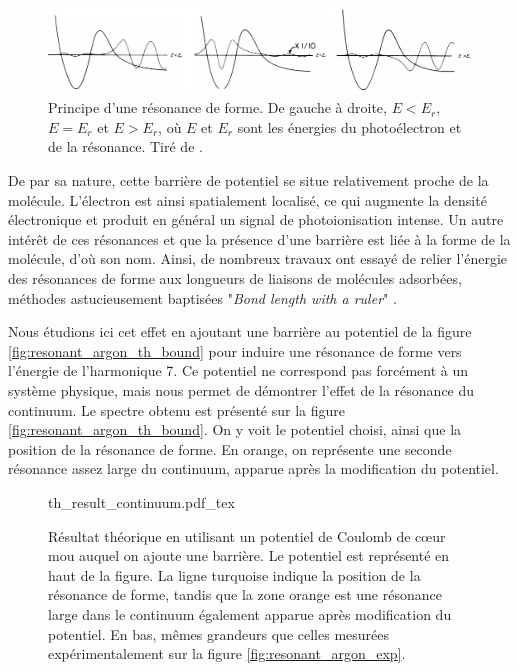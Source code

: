\begin{figure}[!ht]
\centering
\includegraphics[width=1\columnwidth]{Figures/ResonantArgon/shape_resonance.pdf}%
\caption{Principe d'une résonance de forme. De gauche à droite, $E<E_r$, $E=E_r$ et $E>E_r$, où $E$ et $E_r$ sont les énergies du photoélectron et de la résonance. Tiré de .}
\label{fig:shaperesonance}
\end{figure}

De par sa nature, cette barrière de potentiel se situe relativement proche de la molécule. L'électron est ainsi spatialement localisé, ce qui augmente la densité électronique et produit en général un signal de photoionisation intense. Un autre intérêt de ces résonances et que la présence d'une barrière est liée à la forme de la molécule, d'où son nom. Ainsi, de nombreux travaux ont essayé de relier l'énergie des résonances de forme aux longueurs de liaisons de molécules adsorbées, méthodes astucieusement baptisées "\textit{Bond length with a ruler}" .

Nous étudions ici cet effet en ajoutant une barrière au potentiel de la figure \ref{fig:resonant_argon_th_bound} pour induire une résonance de forme vers l'énergie de l'harmonique 7. Ce potentiel ne correspond pas forcément à un système physique, mais nous permet de démontrer l'effet de la résonance du continuum. Le spectre obtenu est présenté sur la figure \ref{fig:resonant_argon_th_bound}. On y voit le potentiel choisi, ainsi que la position de la résonance de forme. En orange, on représente une seconde résonance assez large du continuum, apparue après la modification du potentiel.

\begin{figure}[!ht]
\centering
\def\svgwidth{1\columnwidth}
{th_result_continuum.pdf_tex}
\caption{Résultat théorique en utilisant un potentiel de Coulomb de cœur mou auquel on ajoute une barrière. Le potentiel est représenté en haut de la figure. La ligne turquoise indique la position de la résonance de forme, tandis que la zone orange est une résonance large dans le continuum également apparue après modification du potentiel. En bas, mêmes grandeurs que celles mesurées expérimentalement sur la figure \ref{fig:resonant_argon_exp}.}
\label{fig:resonant_argon_th_continuum}
\end{figure}

